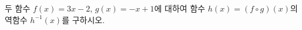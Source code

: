 \hspace*{2mm}\begin{minipage}[t]{\dimexpr\linewidth-2mm\relax}\vspace{0pt}
두 함수 $f(x)=3x-2$, $g(x)=-x+1$에 대하여 함수 $h(x)=(f\circ g)(x)$의 역함수 $h^{-1}(x)$를 구하시오.\end{minipage}
